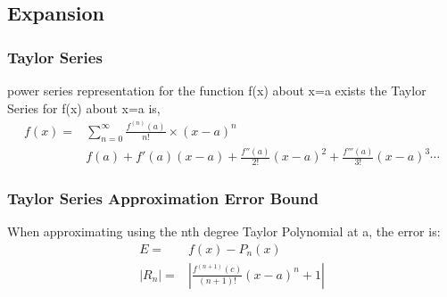 \documentclass{article}
\begin{document}
    \subsection{Expansion}
        \subsubsection{Taylor Series}
        power series representation for the function f(x) about x=a exists the Taylor Series for f(x) about x=a is,
            \begin{align*}
                f(x)   =&\sum^{\infty}_{n=0} \frac{f^{(n)}(a)} {n!}\times(x-a)^n\\[6pt]
                        &f(a) + f'(a)(x-a) + \frac{f''(a)}{2!}(x-a)^2 + \frac{f'''(a)}{3!}(x-a)^3 \cdots
            \end{align*}
            
        \subsubsection{Taylor Series Approximation Error Bound}
        When approximating using the nth degree Taylor Polynomial at a, the error is:
            \begin{align*}
                E =& f(x)-P_n(x)\\[6pt]
                |R_n| =& \left|\frac{f^{(n+1)}(c)}{(n+1)!}(x-a)^n+1\right|
            \end{align*}
        \vspace*{\fill}
        
\cite{PaulsNotes}
\cite{OregonState}



\end{document}
